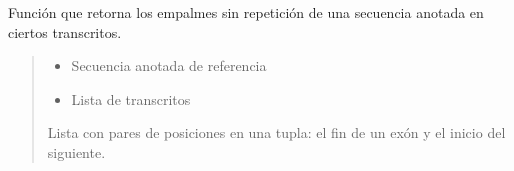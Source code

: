 \documentclass[letterpaper,10pt,spanish]{sphinxmanual}
\begin{document}
\begin{fulllineitems}
\label{\detokenize{diseno:diseno.get_splicings}}
\pysigstartsignatures
{}
\pysigstopsignatures
\sphinxAtStartPar
Función que retorna los empalmes sin repetición de una secuencia anotada en ciertos transcritos.
\begin{quote}\begin{description}
\begin{itemize}
\item {} 
\sphinxAtStartPar
{} \textendash{} Secuencia anotada de referencia

\item {} 
\sphinxAtStartPar
{} \textendash{} Lista de transcritos

\end{itemize}

\sphinxAtStartPar
Lista con pares de posiciones en una tupla: el fin de un exón y el inicio del siguiente.

\end{description}\end{quote}

\end{fulllineitems}


\begin{fulllineitems}
\label{\detokenize{diseno:diseno.main}}
\pysigstartsignatures
{}
\pysigstopsignatures
\end{fulllineitems}

\end{document}
